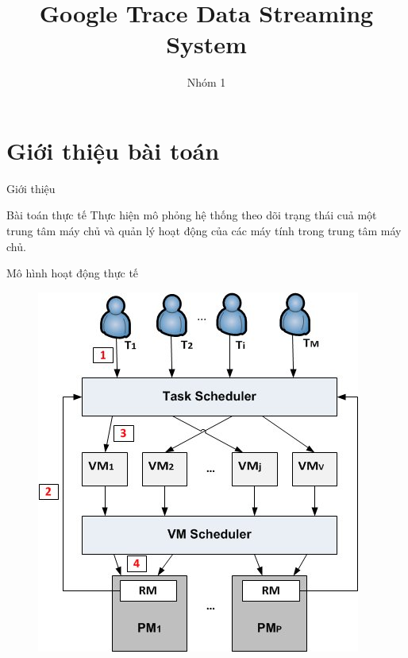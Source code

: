 \documentclass[10pt,xcolor={dvipsnames}]{beamer}
\title{Google Trace Data Streaming System}
\author{Nhóm 1}
\begin{document}
	\begin{frame}
		\maketitle
	\end{frame}
	
	\begin{frame}
		\tableofcontents
	\end{frame}
	
	\section{Giới thiệu bài toán}
	
	\begin{frame}{Giới thiệu}
		\begin{block}
		{Bài toán thực tế}
		Thực hiện mô phỏng hệ thống theo dõi trạng thái cuả một trung tâm máy chủ và quản lý hoạt động của các máy tính trong trung tâm máy chủ.
		\end{block}
		
		\begin{block}
		{Mô hình hoạt động thực tế}
		\begin{figure}
			\includegraphics[scale=0.25]{images/Task-and-VM-scheduling-in-cloud-computing_W640.jpg}
		\end{figure}
		\end{block}
	\end{frame}
	
\end{document}

